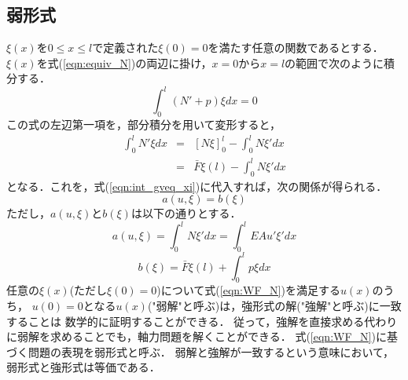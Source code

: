 \documentclass[10pt,a4j]{jarticle}
\begin{document}
\subsection{弱形式}
$\xi (x)$を$0\leq x \leq l$で定義された$\xi(0)=0$を満たす任意の関数であるとする．
$\xi (x)$を式(\ref{eqn:equiv_N})の両辺に掛け，$x=0$から$x=l$の範囲で次のように積分する．
\begin{equation}
	\int _0^l 
	\left(N'+p \right) \xi dx =0
	\label{eqn:int_gveq_xi}
\end{equation}
この式の左辺第一項を，部分積分を用いて変形すると，
\begin{eqnarray}
	\int _0^l N'\xi dx &= & \left[ N\xi \right]_0^l -\int_0^l N \xi'dx  
	\label{eqn:}
	\\
	&= & \bar F \xi(l)  -\int_0^l N \xi'dx  
\end{eqnarray}
となる．これを，式(\ref{eqn:int_gveq_xi})に代入すれば，次の関係が得られる．
\begin{equation}
	a(u,\xi)=b(\xi)
	\label{eqn:WF_N}
\end{equation}
ただし，$a(u,\xi)$と$b(\xi)$は以下の通りとする．
\begin{equation}
	a(u,\xi) = \int_0^l N \xi'dx  
	= \int_0^l EA u' \xi'dx  
	\label{eqn:blinf_N}
\end{equation}
\begin{equation}
	b(\xi)= \bar F \xi (l) + 
	\int_0^l p\xi dx 
	\label{eqn:linf_N}
\end{equation}
任意の$\xi(x)$(ただし$\xi(0)=0$)について式(\ref{eqn:WF_N})を満足する$u(x)$のうち，
$u(0)=0$となる$u(x)$("弱解"と呼ぶ)は，強形式の解("強解"と呼ぶ)に一致することは
数学的に証明することができる．
従って，強解を直接求める代わりに弱解を求めることでも，軸力問題を解くことができる．
式(\ref{eqn:WF_N})に基づく問題の表現を弱形式と呼ぶ．
弱解と強解が一致するという意味において，弱形式と強形式は等価である．
\end{document}
